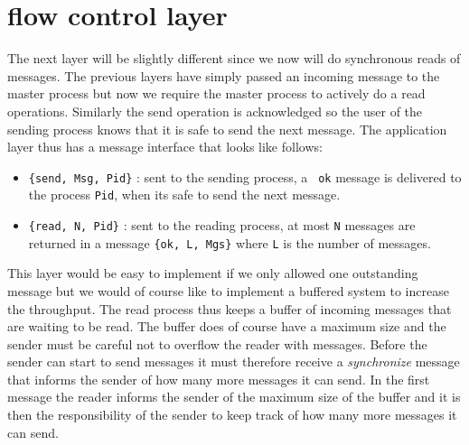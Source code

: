 \documentclass[a4paper,11pt]{article}
\begin{document}
\section{flow control layer}

The next layer will be slightly different since we now will do
synchronous reads of messages. The previous layers have simply passed
an incoming message to the master process but now we require the
master process to actively do a read operations. Similarly the send
operation is acknowledged so the user of the sending process knows
that it is safe to send the next message. The application layer thus has a message interface that looks like follows:

\begin{itemize}
\item {\tt \{send, Msg, Pid\}} : sent to the sending process, a {\tt
    ok} message is delivered to the process {\tt Pid}, when its safe
  to send the next message.

\item {\tt \{read, N, Pid\}} : sent to the reading process, at most
  {\tt N} messages are returned in a message {\tt \{ok, L, Mgs\}}
  where {\tt L} is the number of messages.
\end{itemize}

This layer would be easy to implement if we only allowed one
outstanding message but we would of course like to implement a
buffered system to increase the throughput. The read process thus keeps
a buffer of incoming messages that are waiting to be read. The buffer
does of course have a maximum size and the sender must be careful not
to overflow the reader with messages. Before the sender can start to
send messages it must therefore receive a {\em synchronize} message
that informs the sender of how many more messages it can send. In the
first message the reader informs the sender of the maximum size of the
buffer and it is then the responsibility of the sender to keep track of
how many more messages it can send.
\end{document}
